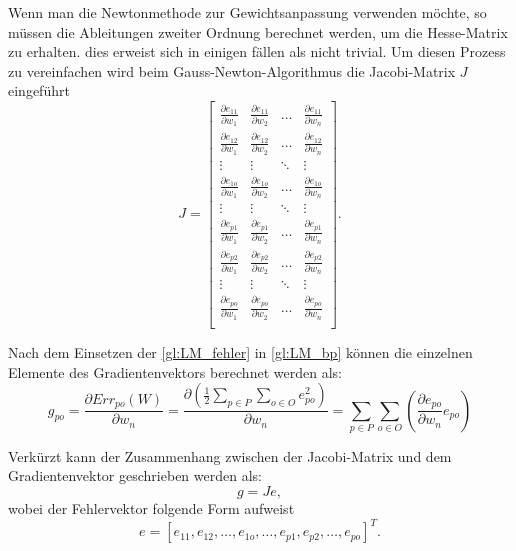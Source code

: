 Wenn man die Newtonmethode zur Gewichtsanpassung verwenden möchte, so müssen die Ableitungen zweiter Ordnung berechnet werden, um die Hesse-Matrix zu erhalten. dies erweist sich in einigen fällen als nicht trivial. Um diesen Prozess zu vereinfachen wird beim Gauss-Newton-Algorithmus die Jacobi-Matrix $J$ eingeführt
\begin{equation}
J
=
 \begin{bmatrix}
    \frac{\partial e_{11}}{\partial w_{1}} & \frac{\partial e_{11}}{\partial w_{2}}  & \dots  & \frac{\partial e_{11}}{\partial w_{n}} \\
    \frac{\partial e_{12}}{\partial w_{1}} & \frac{\partial e_{12}}{\partial w_{2}}  & \dots  & \frac{\partial e_{12}}{\partial w_{n}} \\
    \vdots & \vdots & \ddots & \vdots \\
    \frac{\partial e_{1o}}{\partial w_{1}} & \frac{\partial e_{1o}}{\partial w_{2}}  & \dots  & \frac{\partial e_{1o}}{\partial w_{n}} \\
    \vdots & \vdots & \ddots & \vdots \\
    \frac{\partial e_{p1}}{\partial w_{1}} & \frac{\partial e_{p1}}{\partial w_{2}}  & \dots  & \frac{\partial e_{p1}}{\partial w_{n}} \\
    \frac{\partial e_{p2}}{\partial w_{1}} & \frac{\partial e_{p2}}{\partial w_{2}}  & \dots  & \frac{\partial e_{p2}}{\partial w_{n}} \\
    \vdots & \vdots & \ddots & \vdots \\
    \frac{\partial e_{po}}{\partial w_{1}} & \frac{\partial e_{po}}{\partial w_{2}}  & \dots  & \frac{\partial e_{po}}{\partial w_{n}} \\
 \end{bmatrix}
 .
\end{equation}

Nach dem Einsetzen der \autoref{gl:LM_fehler} in \autoref{gl:LM_bp} können die einzelnen Elemente des Gradientenvektors berechnet werden als:
\begin{equation}
g_{po} = \frac{\partial Err_{po}(W)}{\partial w_{n}} = \frac{\partial \left (\frac{1}{2} \sum_{p \in P} \sum_{o \in O} e_{po}^2 \right )}{\partial w_{n}} 
=
\sum_{p \in P} \sum_{o \in O} \left ( \frac{\partial e_{po}}{\partial w_{n}} e_{po} \right )
\label{gl:LM_g-J}
\end{equation}

Verkürzt kann der Zusammenhang zwischen der Jacobi-Matrix und dem Gradientenvektor geschrieben werden als:
\begin{equation}
g = Je,
\label{gl:LM_Je}
\end{equation}
wobei der Fehlervektor folgende Form aufweist
\begin{equation}
e= \left [ e_{11}, e_{12}, \dots, e_{1o}, \dots, e_{p1}, e_{p2}, \dots, e_{po} \right ]^T.
\label{gl:LM_bp}
\end{equation}

